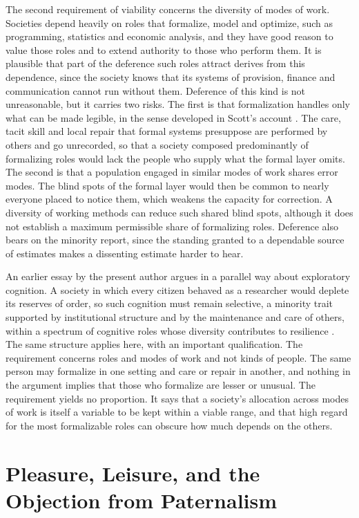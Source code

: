 \documentclass[11pt]{article}
\theoremstyle{definition}
\theoremstyle{remark}
\begin{document}
The second requirement of viability concerns the diversity of modes of work. Societies depend heavily on roles that formalize, model and optimize, such as programming, statistics and economic analysis, and they have good reason to value those roles and to extend authority to those who perform them. It is plausible that part of the deference such roles attract derives from this dependence, since the society knows that its systems of provision, finance and communication cannot run without them. Deference of this kind is not unreasonable, but it carries two risks. The first is that formalization handles only what can be made legible, in the sense developed in Scott's account \cite{scott1998}. The care, tacit skill and local repair that formal systems presuppose are performed by others and go unrecorded, so that a society composed predominantly of formalizing roles would lack the people who supply what the formal layer omits. The second is that a population engaged in similar modes of work shares error modes. The blind spots of the formal layer would then be common to nearly everyone placed to notice them, which weakens the capacity for correction. A diversity of working methods can reduce such shared blind spots, although it does not establish a maximum permissible share of formalizing roles. Deference also bears on the minority report, since the standing granted to a dependable source of estimates makes a dissenting estimate harder to hear.

An earlier essay by the present author argues in a parallel way about exploratory cognition. A society in which every citizen behaved as a researcher would deplete its reserves of order, so such cognition must remain selective, a minority trait supported by institutional structure and by the maintenance and care of others, within a spectrum of cognitive roles whose diversity contributes to resilience \cite{flyxion2025}. The same structure applies here, with an important qualification. The requirement concerns roles and modes of work and not kinds of people. The same person may formalize in one setting and care or repair in another, and nothing in the argument implies that those who formalize are lesser or unusual. The requirement yields no proportion. It says that a society's allocation across modes of work is itself a variable to be kept within a viable range, and that high regard for the most formalizable roles can obscure how much depends on the others.

\section{Pleasure, Leisure, and the Objection from Paternalism}
\end{document}
